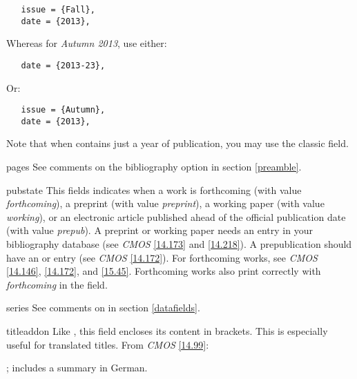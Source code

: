 \documentclass[11pt,letterpaper,oneside]{article}
\begin{document}
\begin{marglist}
\begin{verbatim}
   issue = {Fall},
   date = {2013},
\end{verbatim}

\noindent Whereas for \textit{Autumn 2013}, use either:

\begin{verbatim}
   date = {2013-23},
\end{verbatim}

\noindent Or:

\begin{verbatim}
   issue = {Autumn},
   date = {2013},
\end{verbatim}

\noindent Note that when  contains just a year of
publication, you may use the classic  field.

\item[pages] See comments on the  bibliography option in
section \ref{preamble}.

\item[pubstate] This fields indicates when a work is forthcoming (with
value \textit{forthcoming}), a preprint (with value
\textit{preprint}), a working paper (with value \textit{working}), or
an electronic article published ahead of the official publication date
(with value \textit{prepub}). A preprint or working paper needs an
 entry in your bibliography database (see
\textit{CMOS} \ref{14.173} and \ref{14.218}). A prepublication should
have an  or  entry (see
\textit{CMOS} \ref{14.172}). For forthcoming works, see \textit{CMOS}
\ref{14.146}, \ref{14.172}, and \ref{15.45}. Forthcoming works also
print correctly with \textit{forthcoming} in the 
field.

\begin{bibonly}
\nocite{faraday,huang2015,jubb2015,lucki1980}
\end{bibonly}

\item[series] See comments on  in section
\ref{datafields}.

\item[titleaddon] Like , this field encloses its
content in brackets. This is especially useful for translated titles.
From \textit{CMOS} \ref{14.99}:

\begin{citebib}
\item \cite{wereszycki1977}; includes a summary in German.
\item \cite{pirumova1977b}
\end{citebib}


\end{marglist}
\end{document}
